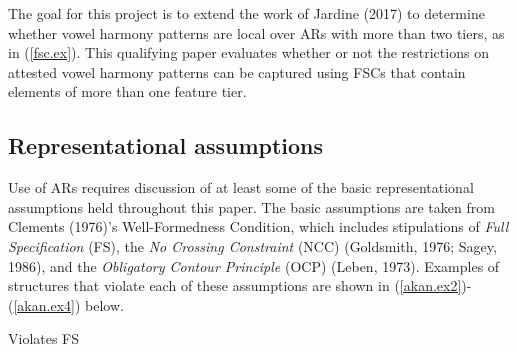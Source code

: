 \documentclass[,doc,floatsintext]{apa6}
\theoremstyle{definition}
\theoremstyle{definition}
\theoremstyle{definition}
\theoremstyle{remark}
\begin{document}
\begin{exe}
\ex \label{fsc.ex}
\end{exe}

The goal for this project is to extend the work of Jardine (2017) to
determine whether vowel harmony patterns are local over ARs with more
than two tiers, as in (\ref{fsc.ex}). This qualifying paper evaluates
whether or not the restrictions on attested vowel harmony patterns can
be captured using FSCs that contain elements of more than one feature
tier.

\subsection{Representational
assumptions}\label{representational-assumptions}

Use of ARs requires discussion of at least some of the basic
representational assumptions held throughout this paper. The basic
assumptions are taken from Clements (1976)'s Well-Formedness Condition,
which includes stipulations of \emph{Full Specification} (FS), the
\emph{No Crossing Constraint} (NCC) (Goldsmith, 1976; Sagey, 1986), and
the \emph{Obligatory Contour Principle} (OCP) (Leben, 1973). Examples of
structures that violate each of these assumptions are shown in
(\ref{akan.ex2})-(\ref{akan.ex4}) below.

\begin{exe}
\ex \label{akan.ex2} Violates FS
\end{exe}
\end{document}

